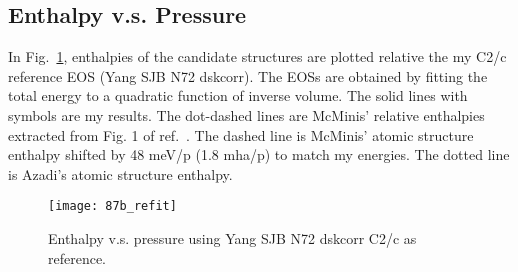 \subsection{Enthalpy v.s. Pressure}
In Fig.~\ref{fig:static-enthalpy-vs-pressure}, enthalpies of the candidate structures are plotted relative the my C2/c reference EOS (Yang SJB N72 dskcorr). The EOSs are obtained by fitting the total energy to a quadratic function of inverse volume. The solid lines with symbols are my results. The dot-dashed lines are McMinis' relative enthalpies extracted from Fig. 1 of ref.~\cite{McMinis2015}. The dashed line is McMinis' atomic structure enthalpy shifted by 48 meV/p (1.8 mha/p) to match my energies. The dotted line is Azadi's atomic structure enthalpy.

\begin{figure}[h]
\texttt{[image: 87b\_refit]}
\caption{Enthalpy v.s. pressure using Yang SJB N72 dskcorr C2/c as reference.\label{fig:static-enthalpy-vs-pressure}}
\end{figure}
